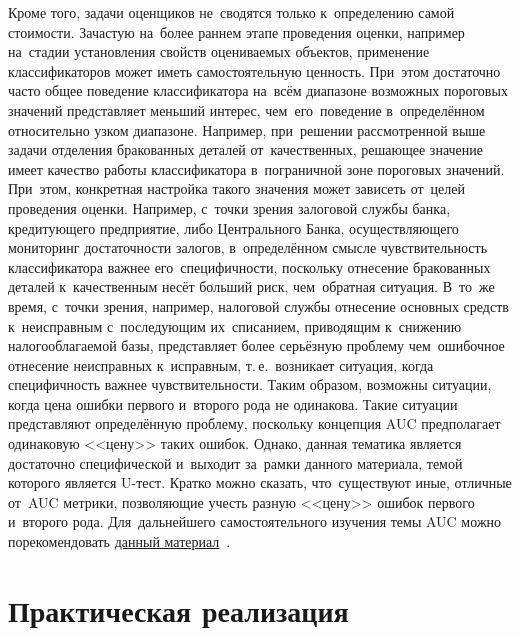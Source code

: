 \documentclass[]{scrreprt}
\begin{document}
Кроме того, задачи оценщиков не~сводятся только к~определению самой стоимости. Зачастую на~более раннем этапе проведения оценки, например на~стадии установления свойств оцениваемых объектов, применение классификаторов может иметь самостоятельную ценность. При~этом достаточно часто общее поведение классификатора на~всём диапазоне возможных пороговых значений представляет меньший интерес, чем~его~поведение в~определённом относительно узком диапазоне. Например, при~решении рассмотренной выше задачи отделения бракованных деталей от~качественных, решающее значение имеет качество работы классификатора в~пограничной зоне пороговых значений. При~этом, конкретная настройка такого значения может зависеть от~целей проведения оценки. Например, с~точки зрения залоговой службы банка, кредитующего предприятие, либо Центрального Банка, осуществляющего мониторинг достаточности залогов, в~определённом смысле чувствительность классификатора важнее его~специфичности, поскольку отнесение бракованных деталей к~качественным несёт больший риск, чем~обратная ситуация. В~то~же время, с~точки зрения, например, налоговой службы отнесение основных средств к~неисправным с~последующим их~списанием, приводящим к~снижению налогооблагаемой базы, представляет более серьёзную проблему чем~ошибочное отнесение неисправных к~исправным, т.\,е.~возникает ситуация, когда специфичность важнее чувствительности. Таким образом, возможны ситуации, когда цена ошибки первого и~второго рода не одинакова. Такие ситуации представляют определённую проблему, поскольку концепция AUC предполагает одинаковую <<цену>> таких ошибок. Однако, данная тематика является достаточно специфической и~выходит за~рамки данного материала, темой которого является U-тест. Кратко можно сказать, что~существуют иные, отличные от~AUC метрики, позволяющие учесть разную <<цену>> ошибок первого и~второго рода. Для~дальнейшего самостоятельного изучения темы AUC можно порекомендовать \href{http://nicolas.kruchten.com/content/2016/01/ml-meets-economics/}{данный материал}~\cite{ML-meets-economics}.
 
\chapter{Практическая реализация}\label{U-test-practice}
\end{document}
